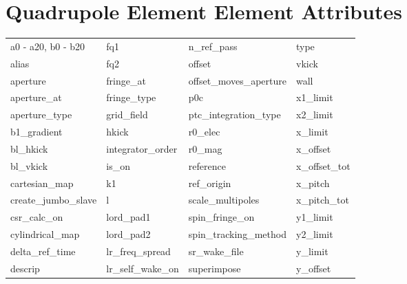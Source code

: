  \section{Quadrupole Element Element Attributes}
 \label{s:list.quadrupole}
 
 \begin{tabular}{llll} \toprule
a0 - a20, b0 - b20          & fq1                         & n_ref_pass                  & type                        \\
alias                       & fq2                         & offset                      & vkick                       \\
aperture                    & fringe_at                   & offset_moves_aperture       & wall                        \\
aperture_at                 & fringe_type                 & p0c                         & x1_limit                    \\
aperture_type               & grid_field                  & ptc_integration_type        & x2_limit                    \\
b1_gradient                 & hkick                       & r0_elec                     & x_limit                     \\
bl_hkick                    & integrator_order            & r0_mag                      & x_offset                    \\
bl_vkick                    & is_on                       & reference                   & x_offset_tot                \\
cartesian_map               & k1                          & ref_origin                  & x_pitch                     \\
create_jumbo_slave          & l                           & scale_multipoles            & x_pitch_tot                 \\
csr_calc_on                 & lord_pad1                   & spin_fringe_on              & y1_limit                    \\
cylindrical_map             & lord_pad2                   & spin_tracking_method        & y2_limit                    \\
delta_ref_time              & lr_freq_spread              & sr_wake_file                & y_limit                     \\
descrip                     & lr_self_wake_on             & superimpose                 & y_offset                    \\

\end{tabular}
